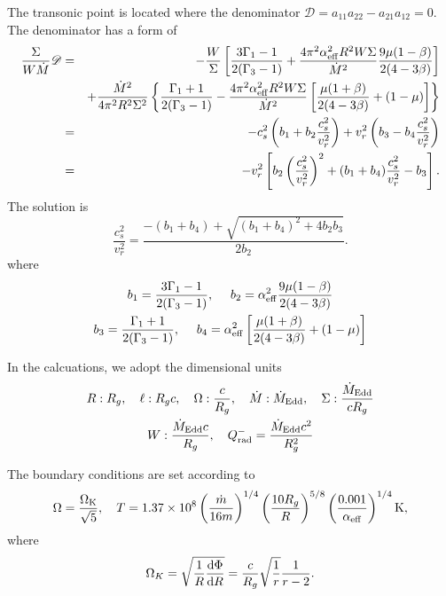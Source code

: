 \documentclass[oneside]{book}
\def\rd{{\rm d}}
\begin{document}
The transonic point is located where the denominator $\mathscr{D}=a_{11}a_{22}-a_{21}a_{12}=0$. 
The denominator has a form of 
\begin{eqnarray}
\frac{\Sigma}{W\dot M}\mathscr{D}&=&-\frac{W}{\Sigma}
\left[ \frac{3\Gamma_1-1}{2(\Gamma_3-1)} 
+\frac{4\pi^2\alpha_{\rm eff}^2 R^2 W\Sigma}{\dot M^2} \frac{9\mu(1-\beta)}{2(4-3\beta)}\right]\\
&&+\frac{\dot M^2}{4\pi^2R^2\Sigma^2}\left\{\frac{\Gamma_1+1}{2(\Gamma_3-1)}
-\frac{4\pi^2\alpha_{\rm eff}^2 R^2 W\Sigma}{\dot M^2}\left[\frac{\mu(1+\beta)}{2(4-3\beta)}+(1-\mu)\right]\right\}\\
&=&-c_s^2\left(b_1 + b_2\frac{c_s^2}{v_r^2}\right)
+v_r^2\left(b_3-b_4\frac{c_s^2}{v_r^2}\right)\\
&=&-v_r^2\left[b_2\left(\frac{c_s^2}{v_r^2}\right)^2 + (b_1+b_4)\frac{c_s^2}{v_r^2} - b_3\right].
\end{eqnarray}
The solution is 
\begin{equation}
\frac{c_s^2}{v_r^2}=\frac{-(b_1+b_4)+\sqrt{(b_1+b_4)^2+4b_2b_3}}{2b_2}.
\end{equation}
where 
\begin{gather}
b_1=\frac{3\Gamma_1-1}{2(\Gamma_3-1)},~~~~b_2= \alpha_{\rm eff}^2\frac{9\mu(1-\beta)}{2(4-3\beta)}\\
b_3=\frac{\Gamma_1+1}{2(\Gamma_3-1)},~~~~b_4= \alpha_{\rm eff}^2\left[\frac{\mu(1+\beta)}{2(4-3\beta)}+(1-\mu)\right]
\end{gather}

In the calcuations, we adopt the dimensional units
\begin{gather}
R: R_g,~~~\ell: R_gc,~~~\Omega:\frac{c}{R_g},~~~\dot M:\dot M_{\rm Edd},~~~\Sigma:\frac{\dot M_{\rm Edd}}{cR_g}\\
W: \frac{\dot M_{\rm Edd} c}{R_g}, ~~~Q_{\rm rad}^-=\frac{\dot M_{\rm Edd} c^2}{R_g^2}
\end{gather}

The boundary conditions are set according to \cite{Wang1999}
\begin{equation}
\Omega=\frac{\Omega_{\rm K}}{\sqrt{5}},~~~T=1.37\times10^8\left(\frac{\dot m}{16m}\right)^{1/4}
\left(\frac{10R_g}{R}\right)^{5/8}\left(\frac{0.001}{\alpha_{\rm eff}}\right)^{1/4}{\rm K},
\end{equation}
where 
\begin{equation}
\Omega_K=\sqrt{\frac{1}{R}\frac{\rd\Phi}{\rd R}}=\frac{c}{R_g}\sqrt{\frac{1}{r}}\frac{1}{r-2}.
\end{equation}
\end{document}
